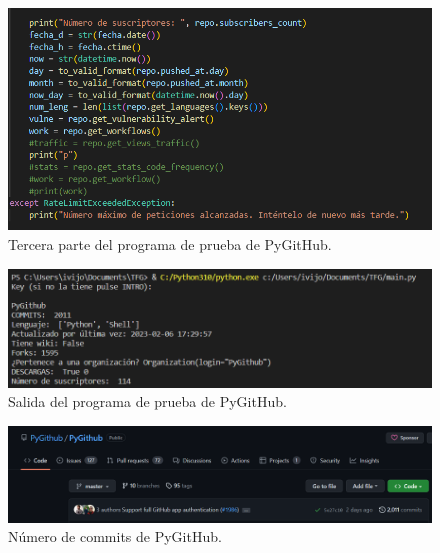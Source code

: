 \documentclass[a4paper, 12pt]{book}
\begin{document}
\begin{figure}
    \centering
    \includegraphics[width=1\textwidth, keepaspectratio]{img/pygithub_3.png}
    \caption{Tercera parte del programa de prueba de PyGitHub.}\label{fig:pygithub_3}
\end{figure}
\begin{figure}
    \centering
    \includegraphics[width=1\textwidth, keepaspectratio]{img/pygithub_salida.png}
    \caption{Salida del programa de prueba de PyGitHub.}\label{fig:pygithub_salida}
\end{figure}
\begin{figure}
    \centering
    \includegraphics[width=1\textwidth, keepaspectratio]{img/pygithub_commits.png}
    \caption{Número de commits de PyGitHub.}\label{fig:pygithub_commits}
\end{figure}
\end{document}
